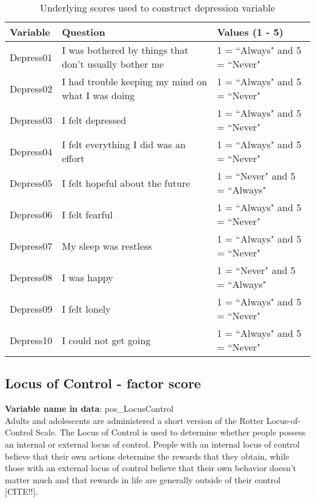 \begin{table}[H]
\begin{center}
\footnotesize{
\caption{Underlying scores used to construct depression variable}
	\begin{tabular}{l L{6cm} l}
	\hline
	\textbf{Variable} 	& \textbf{Question} 											& \textbf{Values (1 - 5)} \\
	\hline
	Depress01			& I was bothered by things that don’t usually bother me			& 1 = ``Always" and 5 = ``Never"  \\	
	Depress02			& I had trouble keeping my mind on what I was doing			& 1 = ``Always" and 5 = ``Never"  	\\
	Depress03			& I felt depressed											& 1 = ``Always" and 5 = ``Never"	 \\
	Depress04			& I felt everything I did was an effort							& 1 = ``Always" and 5 = ``Never"	 \\
	Depress05			& I felt hopeful about the future								& 1 = ``Never" and 5 = ``Always"	 \\
	Depress06			& I felt fearful 												& 1 = ``Always" and 5 = ``Never"	\\ 
	Depress07			& My sleep was restless										& 1 = ``Always" and 5 = ``Never" \\
	Depress08			& I was happy												& 1 = ``Never" and 5 = ``Always" \\
	Depress09			& I felt lonely												& 1 = ``Always" and 5 = ``Never"  \\
	Depress10			& I could not get going 										& 1 = ``Always" and 5 = ``Never" \\
	
	\hline
	
	\end{tabular}
}

\end{center}
\end{table}
\clearpage

\subsection{Locus of Control - factor score}
\textbf{Variable name in data}: pos\_LocusControl \\[.3cm]
Adults and adolescents are administered a short version of the Rotter Locus-of-Control Scale. The Locus of Control is used to determine whether people possess an internal or external locus of control. People with an internal locus of control believe that their own actions determine the rewards that they obtain, while those with an external locus of control believe that their own behavior doesn't matter much and that rewards in life are generally outside of their control [CITE!!]. 

